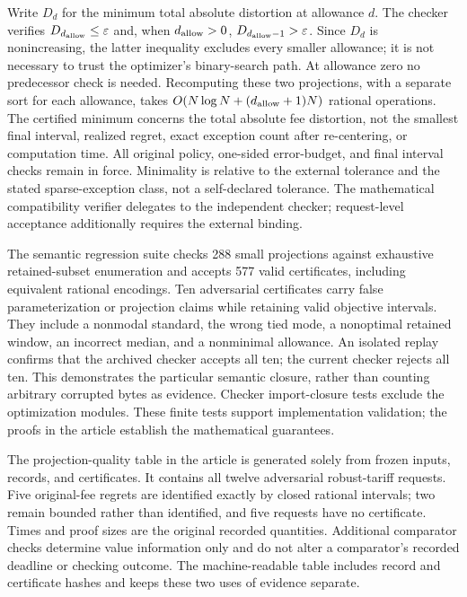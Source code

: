 \documentclass[11pt,letterpaper]{article}
\theoremstyle{definition}\newtheorem{remark}[theorem]{Remark}
\begin{document}
Write $D_d$ for the minimum total absolute distortion at allowance $d$. The checker verifies $D_{d_{\rm allow}}\leq\varepsilon$ and, when $d_{\rm allow}>0$, $D_{d_{\rm allow}-1}>\varepsilon$. Since $D_d$ is nonincreasing, the latter inequality excludes every smaller allowance; it is not necessary to trust the optimizer's binary-search path. At allowance zero no predecessor check is needed. Recomputing these two projections, with a separate sort for each allowance, takes $O(N\log N+(d_{\rm allow}+1)N)$ rational operations. The certified minimum concerns the total absolute fee distortion, not the smallest final interval, realized regret, exact exception count after re-centering, or computation time. All original policy, one-sided error-budget, and final interval checks remain in force. Minimality is relative to the external tolerance and the stated sparse-exception class, not a self-declared tolerance. The mathematical compatibility verifier delegates to the independent checker; request-level acceptance additionally requires the external binding.

The semantic regression suite checks 288 small projections against exhaustive retained-subset enumeration and accepts 577 valid certificates, including equivalent rational encodings. Ten adversarial certificates carry false parameterization or projection claims while retaining valid objective intervals. They include a nonmodal standard, the wrong tied mode, a nonoptimal retained window, an incorrect median, and a nonminimal allowance. An isolated replay confirms that the archived checker accepts all ten; the current checker rejects all ten. This demonstrates the particular semantic closure, rather than counting arbitrary corrupted bytes as evidence. Checker import-closure tests exclude the optimization modules. These finite tests support implementation validation; the proofs in the article establish the mathematical guarantees.

The projection-quality table in the article is generated solely from frozen inputs, records, and certificates. It contains all twelve adversarial robust-tariff requests. Five original-fee regrets are identified exactly by closed rational intervals; two remain bounded rather than identified, and five requests have no certificate. Times and proof sizes are the original recorded quantities. Additional comparator checks determine value information only and do not alter a comparator's recorded deadline or checking outcome. The machine-readable table includes record and certificate hashes and keeps these two uses of evidence separate.
\end{document}
